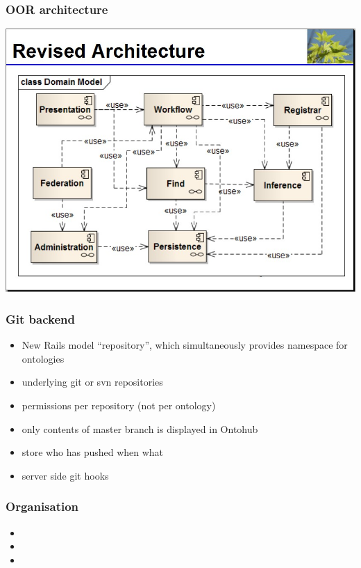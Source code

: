 \documentclass[german]{beamer}
\begin{document}
\begin{frame}
\frametitle{OOR architecture}
\includegraphics[width=\textwidth]{revised-OOR-architecture-proposal--ToddSchneider-KenBaclawski_20101119.jpg}
\end{frame}


\begin{frame}
\frametitle{Git backend}
\begin{itemize}
\item New Rails model ``repository'', which simultaneously provides namespace for ontologies
\item underlying git or svn repositories
\item permissions per repository (not per ontology)
\item only contents of master branch is displayed in Ontohub
\item store who has pushed when what
\item server side git hooks
\end{itemize}
\end{frame}

\begin{frame}
\frametitle{Organisation}
\begin{itemize}
\item 
\item 
\item 
\end{itemize}
\end{frame}
\end{document}
